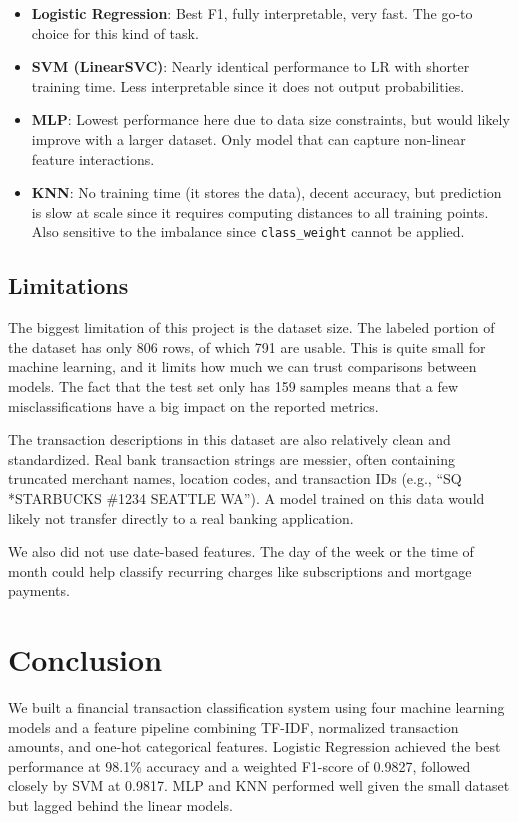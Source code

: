 \documentclass[11pt]{article}
\begin{document}
\begin{itemize}
  \item \textbf{Logistic Regression}: Best F1, fully interpretable, very fast. The go-to choice for this kind of task.
  \item \textbf{SVM (LinearSVC)}: Nearly identical performance to LR with shorter training time. Less interpretable since it does not output probabilities.
  \item \textbf{MLP}: Lowest performance here due to data size constraints, but would likely improve with a larger dataset. Only model that can capture non-linear feature interactions.
  \item \textbf{KNN}: No training time (it stores the data), decent accuracy, but prediction is slow at scale since it requires computing distances to all training points. Also sensitive to the imbalance since \texttt{class\_weight} cannot be applied.
\end{itemize}

\subsection{Limitations}

The biggest limitation of this project is the dataset size. The labeled portion of the dataset has only 806 rows, of which 791 are usable. This is quite small for machine learning, and it limits how much we can trust comparisons between models. The fact that the test set only has 159 samples means that a few misclassifications have a big impact on the reported metrics.

The transaction descriptions in this dataset are also relatively clean and standardized. Real bank transaction strings are messier, often containing truncated merchant names, location codes, and transaction IDs (e.g., ``SQ *STARBUCKS \#1234 SEATTLE WA''). A model trained on this data would likely not transfer directly to a real banking application.

We also did not use date-based features. The day of the week or the time of month could help classify recurring charges like subscriptions and mortgage payments.

\section{Conclusion}

We built a financial transaction classification system using four machine learning models and a feature pipeline combining TF-IDF, normalized transaction amounts, and one-hot categorical features. Logistic Regression achieved the best performance at 98.1\% accuracy and a weighted F1-score of 0.9827, followed closely by SVM at 0.9817. MLP and KNN performed well given the small dataset but lagged behind the linear models.
\end{document}
